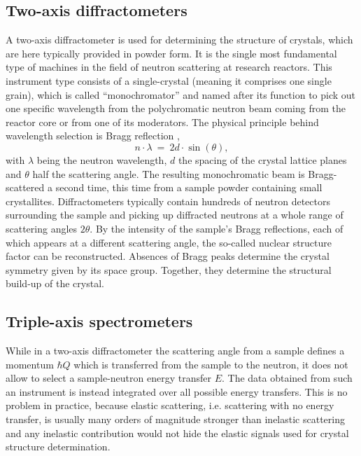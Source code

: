 \subsection{Two-axis diffractometers}

A two-axis diffractometer is used for determining the structure of crystals, which are here typically provided in powder form. It is the single most fundamental type of machines in the field of neutron scattering at research reactors. This instrument type consists of a single-crystal (meaning it comprises one single grain), which is called ``monochromator'' and named after its function to pick out one specific wavelength from the polychromatic neutron beam coming from the reactor core or from one of its moderators. The physical principle behind wavelength selection is Bragg reflection \cite[p. 68]{Gross2012},
\begin{equation}
	n \cdot \lambda \ =\  2 d \cdot \sin\left(\theta\right),
\end{equation}
with $\lambda$ being the neutron wavelength, $d$ the spacing of the crystal lattice planes and $\theta$ half the scattering angle.
The resulting monochromatic beam is Bragg-scattered a second time, this time from a sample powder containing small crystallites. Diffractometers typically contain hundreds of neutron detectors surrounding the sample and picking up diffracted neutrons at a whole range of scattering angles $2 \theta$. By the intensity of the sample's Bragg reflections, each of which appears at a different scattering angle, the so-called nuclear structure factor can be reconstructed. Absences of Bragg peaks determine the crystal symmetry given by its space group. Together, they determine the structural build-up of the crystal.


\subsection{Triple-axis spectrometers}

While in a two-axis diffractometer the scattering angle from a sample defines a momentum $\hbar Q$ which is transferred from the sample to the neutron, it does not allow to select a sample-neutron energy transfer $E$. The data obtained from such an instrument is instead integrated over all possible energy transfers. This is no problem in practice, because elastic scattering, i.e. scattering with no energy transfer, is usually many orders of magnitude stronger than inelastic scattering and any inelastic contribution would not hide the elastic signals used for crystal structure determination.

